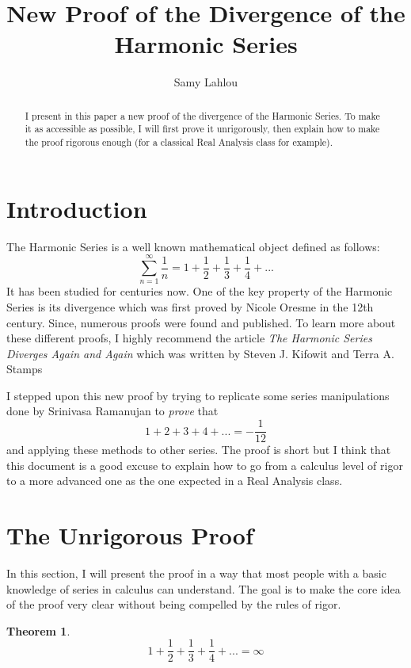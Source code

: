 \documentclass[12pt]{article}
\title{New Proof of the Divergence of the Harmonic Series}
\author{Samy Lahlou}
\date{}
\theoremstyle{definition}
\newtheorem{theorem}{Theorem}[section]
\begin{document}
\maketitle

\begin{abstract}
    I present in this paper a new proof of the divergence of the Harmonic Series. To make it as accessible as possible, I will first prove it unrigorously, then explain how to make the proof rigorous enough (for a classical Real Analysis class for example).
\end{abstract}

\tableofcontents

\newpage

\section{Introduction}
The Harmonic Series is a well known mathematical object defined as follows:
$$\sum_{n=1}^{\infty}\frac{1}{n} = 1 + \frac{1}{2} + \frac{1}{3} + \frac{1}{4} + ...$$
It has been studied for centuries now. One of the key property of the Harmonic Series is its divergence which was first proved by Nicole Oresme in the 12th century. Since, numerous proofs were found and published. To learn more about these different proofs, I highly recommend the article \textit{The Harmonic Series Diverges Again and Again} which was written by Steven J. Kifowit and Terra A. Stamps \cite{harmonicseries} 

I stepped upon this new proof by trying to replicate some series manipulations done by Srinivasa Ramanujan to \textit{prove} that
$$1 + 2 + 3 + 4 + ... = -\frac{1}{12}$$
and applying these methods to other series. The proof is short but I think that this document is a good excuse to explain how to go from a calculus level of rigor to a more advanced one as the one expected in a Real Analysis class.

\section{The Unrigorous Proof}

In this section, I will present the proof in a way that most people with a basic knowledge of series in calculus can understand. The goal is to make the core idea of the proof very clear without being compelled by the rules of rigor. 

\begin{theorem}
    $$ 1 + \frac{1}{2} + \frac{1}{3} + \frac{1}{4} + ... = \infty$$
\end{theorem}
\end{document}
